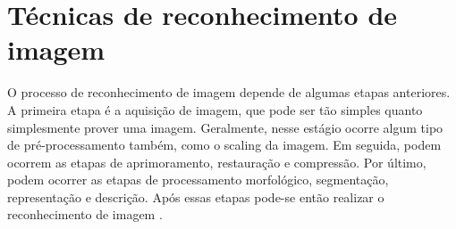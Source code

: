 \documentclass[12pt, %
openright, 
oneside, %
a4paper,    %
brazil]{facom-ufu-abntex2}
\begin{document}





\section{Técnicas de reconhecimento de imagem}
O processo de reconhecimento de imagem depende de algumas etapas anteriores. A
primeira etapa é a aquisição de imagem, que pode ser tão simples quanto
simplesmente prover uma imagem. Geralmente, nesse estágio ocorre algum tipo de
pré-processamento também, como o  scaling da imagem. Em seguida, podem ocorrem
as etapas de aprimoramento, restauração e compressão. Por último, podem ocorrer
as etapas de processamento morfológico, segmentação, representação e descrição.
Após essas etapas pode-se então realizar o reconhecimento de imagem
\cite{gonzalez2002digital}.
\end{document}

